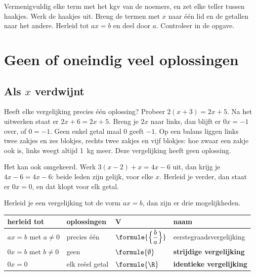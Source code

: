 \begin{werkwijze}
Vermenigvuldig elke term met het kgv van de noemers, en zet elke teller tussen haakjes. Werk de haakjes uit. Breng de termen met $x$ naar één lid en de getallen naar het andere. Herleid tot $ax = b$ en deel door $a$. Controleer in de opgave.
\end{werkwijze}


\begin{oefeningen}
\end{oefeningen}

\section{Geen of oneindig veel oplossingen}

\subsection{Als \texorpdfstring{$x$}{x} verdwijnt}

Heeft elke vergelijking precies één oplossing? Probeer $2(x + 3) = 2x + 5$. Na het uitwerken staat er $2x + 6 = 2x + 5$. Breng je $2x$ naar links, dan blijft er $0x = -1$ over, of $0 = -1$. Geen enkel getal maal 0 geeft $-1$. Op een balans liggen links twee zakjes en zes blokjes, rechts twee zakjes en vijf blokjes: hoe zwaar een zakje ook is, links weegt altijd 1~kg meer. Deze vergelijking heeft geen oplossing.

Het kan ook omgekeerd. Werk $3(x - 2) + x = 4x - 6$ uit, dan krijg je $4x - 6 = 4x - 6$: beide leden zijn gelijk, voor elke $x$. Herleid je verder, dan staat er $0x = 0$, en dat klopt voor elk getal.

\begin{theorie}
Herleid je een vergelijking tot de vorm $ax = b$, dan zijn er drie mogelijkheden.

\vspace{1mm}
{\centering{}\renewcommand{\arraystretch}{1.6}%
\begin{tabular}{|>{\centering\arraybackslash}m{3.2cm}|>{\centering\arraybackslash}m{2.8cm}|>{\centering\arraybackslash}m{2.2cm}|>{\centering\arraybackslash}m{4.4cm}|}
\hline
\textbf{herleid tot} & \textbf{oplossingen} & $\boldsymbol{V}$ & \textbf{naam} \\ \hline
$ax = b$ met $a \neq 0$ & precies één & $\formule{\Bigl\{\dfrac ba\Bigr\}}$ & eerstegraadsvergelijking \\ \hline
$0x = b$ met $b \neq 0$ & geen & $\formule{\emptyset}$ & \textbf{\textcolor{accent}{strijdige vergelijking}} \\ \hline
$0x = 0$ & elk reëel getal & $\formule{\R}$ & \textbf{\textcolor{accent}{identieke vergelijking}} \\ \hline
\end{tabular}\par}
\end{theorie}

